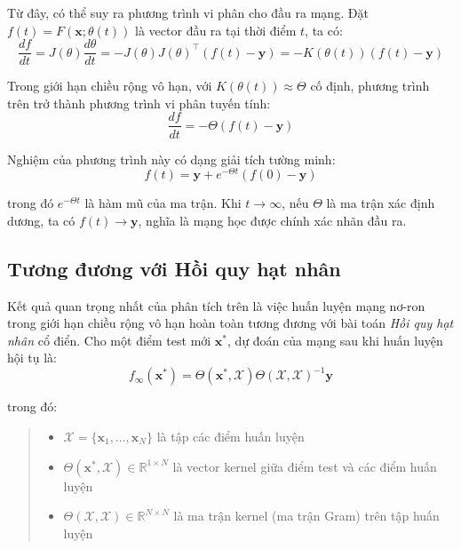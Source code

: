 Từ đây, có thể suy ra phương trình vi phân cho đầu ra mạng. Đặt $f(t) = F(\mathbf{x}; \theta(t))$ là vector đầu ra tại thời điểm $t$, ta có:
\begin{equation}
    \frac{df}{dt} = J(\theta) \frac{d\theta}{dt} = -J(\theta) J(\theta)^\top (f(t) - \mathbf{y}) = -K(\theta(t))(f(t) - \mathbf{y})
\end{equation}

Trong giới hạn chiều rộng vô hạn, với $K(\theta(t)) \approx \Theta$ cố định, phương trình trên trở thành phương trình vi phân tuyến tính:
\begin{equation}
    \frac{df}{dt} = -\Theta(f(t) - \mathbf{y})
\end{equation}

Nghiệm của phương trình này có dạng giải tích tường minh:
\begin{equation}
    f(t) = \mathbf{y} + e^{-\Theta t}(f(0) - \mathbf{y})
\end{equation}

trong đó $e^{-\Theta t}$ là hàm mũ của ma trận. Khi $t \rightarrow \infty$, nếu $\Theta$ là ma trận xác định dương, ta có $f(t) \rightarrow \mathbf{y}$, nghĩa là mạng học được chính xác nhãn đầu ra.

\subsection{Tương đương với Hồi quy hạt nhân}

Kết quả quan trọng nhất của phân tích trên là việc huấn luyện mạng nơ-ron trong giới hạn chiều rộng vô hạn hoàn toàn tương đương với bài toán \textit{Hồi quy hạt nhân} cổ điển. Cho một điểm test mới $\mathbf{x}^*$, dự đoán của mạng sau khi huấn luyện hội tụ là:
\begin{equation}
    f_\infty(\mathbf{x}^*) = \Theta(\mathbf{x}^*, \mathcal{X}) \Theta(\mathcal{X}, \mathcal{X})^{-1} \mathbf{y}
\end{equation}

trong đó:
\begin{quote}
\begin{itemize}
    \item $\mathcal{X} = \{\mathbf{x}_1, \ldots, \mathbf{x}_N\}$ là tập các điểm huấn luyện
    \item $\Theta(\mathbf{x}^*, \mathcal{X}) \in \mathbb{R}^{1 \times N}$ là vector kernel giữa điểm test và các điểm huấn luyện
    \item $\Theta(\mathcal{X}, \mathcal{X}) \in \mathbb{R}^{N \times N}$ là ma trận kernel (ma trận Gram) trên tập huấn luyện
\end{itemize}
\end{quote}


